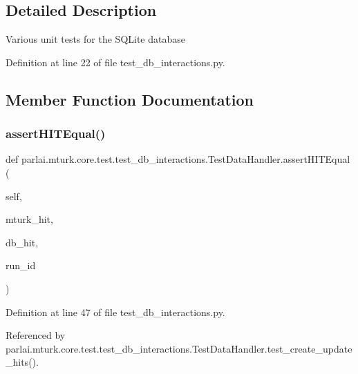\subsection{Detailed Description}
\begin{DoxyVerb}Various unit tests for the SQLite database\end{DoxyVerb}
 

Definition at line 22 of file test\+\_\+db\+\_\+interactions.\+py.



\subsection{Member Function Documentation}
\mbox{\label{classparlai_1_1mturk_1_1core_1_1test_1_1test__db__interactions_1_1TestDataHandler_ae22579287c9c54cf6c0a4dd3e87a7ada}} 
\subsubsection{\texorpdfstring{assert\+H\+I\+T\+Equal()}{assertHITEqual()}}
{\footnotesize\ttfamily def parlai.\+mturk.\+core.\+test.\+test\+\_\+db\+\_\+interactions.\+Test\+Data\+Handler.\+assert\+H\+I\+T\+Equal (\begin{DoxyParamCaption}\item[{}]{self,  }\item[{}]{mturk\+\_\+hit,  }\item[{}]{db\+\_\+hit,  }\item[{}]{run\+\_\+id }\end{DoxyParamCaption})}



Definition at line 47 of file test\+\_\+db\+\_\+interactions.\+py.



Referenced by parlai.\+mturk.\+core.\+test.\+test\+\_\+db\+\_\+interactions.\+Test\+Data\+Handler.\+test\+\_\+create\+\_\+update\+\_\+hits().

